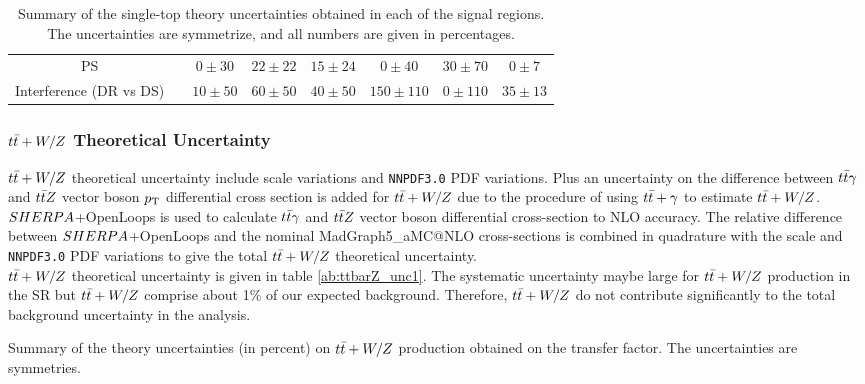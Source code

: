\begin{table}[!h]
\begin{center}
\begin{tabular}{|c|c|c|c|c|c|c|c|}
          PS &   &     $0\pm30$&       $22\pm22$&      $15\pm24$&      $0\pm40$&       $30\pm70$&      $0\pm7$\\
          Interference (DR vs DS) &  &      $10\pm50$&      $60\pm50$&      $40\pm50$&      $150\pm110$&    $0\pm110$&      $35\pm13$\\
          \hline
        \end{tabular}
    \end{center}
    \caption{Summary of the single-top theory uncertainties obtained in each of the signal regions. The uncertainties are symmetrize, and all numbers are given in percentages.}
    \label{tab:single_top_unc3}
  \end{table}

\subsubsection*{$t\bar{t}+W/Z$ Theoretical Uncertainty}

\indent $t\bar{t}+W/Z$ theoretical uncertainty include scale variations and \texttt{NNPDF3.0} PDF variations.  Plus an uncertainty on the difference between $t\bar{t}\gamma$ and $t\bar{t} Z$ vector boson $p_{\mathrm{T}}$ differential cross section is added for $t\bar{t}+W/Z$ due to the procedure of using $t\bar{t}+\gamma$ to estimate $t\bar{t}+W/Z$.  $SHERPA$+OpenLoops is used to calculate $t\bar{t} \gamma$ and $t\bar{t} Z$ vector boson differential cross-section to NLO accuracy.  The relative difference between $SHERPA$+OpenLoops and the nominal {\sc MadGraph5\_aMC\/@NLO} cross-sections is combined in quadrature with the scale and \texttt{NNPDF3.0} PDF variations to give the total $t\bar{t}+W/Z$ theoretical uncertainty. \\

\indent $t\bar{t}+W/Z$ theoretical uncertainty is given in table \ref{ab:ttbarZ_unc1}.  The systematic uncertainty maybe large for $t\bar{t}+W/Z$ production in the SR but $t\bar{t}+W/Z$ comprise about 1\% of our expected background. Therefore, $t\bar{t}+W/Z$ do not contribute significantly to the total background uncertainty in the analysis. \\

  \begin{table}[!h]
    \begin{center} \footnotesize
      
    \end{center}
    \caption{Summary of the theory uncertainties (in percent) on $t\bar{t}+W/Z$ production obtained on the transfer factor. The uncertainties are symmetries.}
    \label{tab:ttbarZ_unc1}
  \end{table}

